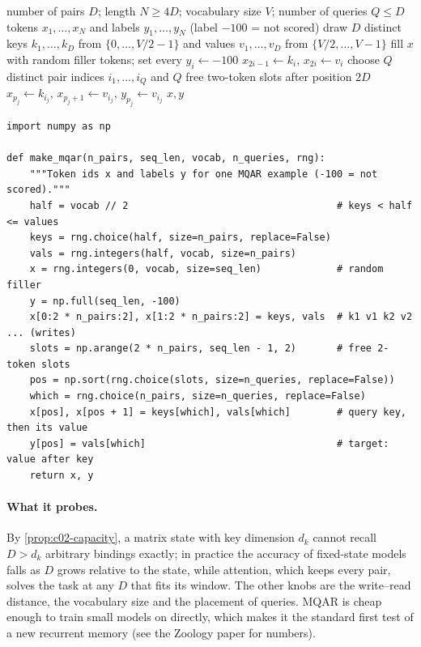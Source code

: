 \begin{algorithm}[htb]
\caption{Constructing one multi-query associative recall (MQAR) example}\label{alg:c02-mqar}
\begin{algorithmic}[1]
\Require number of pairs $D$; length $N \ge 4D$; vocabulary size $V$; number of queries $Q \le D$
\Ensure tokens $x_1,\dots,x_N$ and labels $y_1,\dots,y_N$ (label $-100$ = not scored)
\State draw $D$ distinct keys $k_1,\dots,k_D$ from $\{0,\dots,V/2-1\}$ and values $v_1,\dots,v_D$
  from $\{V/2,\dots,V-1\}$
\State fill $x$ with random filler tokens; set every $y_i \gets -100$
  \State $x_{2i-1} \gets k_i$, \quad $x_{2i} \gets v_i$ 
\EndFor
\State choose $Q$ distinct pair indices $i_1,\dots,i_Q$ and $Q$ free two-token slots after position $2D$
  \State $x_{p_j} \gets k_{i_j}$, \quad $x_{p_j+1} \gets v_{i_j}$, \quad $y_{p_j} \gets v_{i_j}$
\EndFor
\State \Return $x, y$ 
\end{algorithmic}
\end{algorithm}

\begin{lstlisting}[caption={Reference implementation (ours): generating one MQAR example (NumPy).},label={lst:c02-mqar}]
import numpy as np

def make_mqar(n_pairs, seq_len, vocab, n_queries, rng):
    """Token ids x and labels y for one MQAR example (-100 = not scored)."""
    half = vocab // 2                                    # keys < half <= values
    keys = rng.choice(half, size=n_pairs, replace=False)
    vals = rng.integers(half, vocab, size=n_pairs)
    x = rng.integers(0, vocab, size=seq_len)             # random filler
    y = np.full(seq_len, -100)
    x[0:2 * n_pairs:2], x[1:2 * n_pairs:2] = keys, vals  # k1 v1 k2 v2 ... (writes)
    slots = np.arange(2 * n_pairs, seq_len - 1, 2)       # free 2-token slots
    pos = np.sort(rng.choice(slots, size=n_queries, replace=False))
    which = rng.choice(n_pairs, size=n_queries, replace=False)
    x[pos], x[pos + 1] = keys[which], vals[which]        # query key, then its value
    y[pos] = vals[which]                                 # target: value after key
    return x, y
\end{lstlisting}

\paragraph{What it probes.} By \cref{prop:c02-capacity}, a matrix state with key dimension $d_k$
cannot recall $D > d_k$ arbitrary bindings exactly; in practice the accuracy of fixed-state models
falls as $D$ grows relative to the state, while attention, which keeps every pair, solves the task at
any $D$ that fits its window. The other knobs are the write--read distance, the vocabulary size and
the placement of queries. MQAR is cheap enough to train small models on directly, which makes it the
standard first test of a new recurrent memory (see the Zoology paper for numbers).

